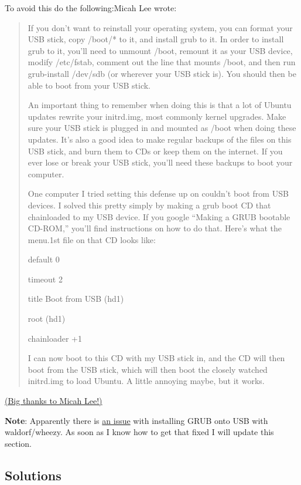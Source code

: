 \documentclass{article}
\begin{document}
 To avoid this do the following:{\sc Micah Lee wrote:}\begin{quotation}


 If you don’t want to reinstall your operating system, you can format your USB stick, copy /boot/* to it, and install grub to it. In order to install grub to it, you’ll need to unmount /boot, remount it as your USB device, modify /etc/fstab, comment out the line that mounts /boot, and then run grub-install /dev/sdb (or wherever your USB stick is). You should then be able to boot from your USB stick.


 An important thing to remember when doing this is that a lot of Ubuntu updates rewrite your initrd.img, most commonly kernel upgrades. Make sure your USB stick is plugged in and mounted as /boot when doing these updates. It’s also a good idea to make regular backups of the files on this USB stick, and burn them to CDs or keep them on the internet. If you ever lose or break your USB stick, you’ll need these backups to boot your computer.


 One computer I tried setting this defense up on couldn’t boot from USB devices. I solved this pretty simply by making a grub boot CD that chainloaded to my USB device. If you google “Making a GRUB bootable CD-ROM,” you’ll find instructions on how to do that. Here’s what the menu.1st file on that CD looks like:


 default 0

timeout 2

title Boot from USB (hd1)

root (hd1)

chainloader +1


 I can now boot to this CD with my USB stick in, and the CD will then boot from the USB stick, which will then boot the closely watched initrd.img to load Ubuntu. A little annoying maybe, but it works.\end{quotation}


 \href{https://twopointfouristan.wordpress.com/2011/04/17/pwning-past-whole-disk-encryption}{(Big thanks to Micah Lee!)}


 \textbf{Note}: Apparently there is \href{http://crunchbang.org/forums/viewtopic.php?pid=292208#p292208}{an issue} with installing GRUB onto USB with waldorf/wheezy. As soon as I know how to get that fixed I will update this section. 
\subsection{Solutions}
\end{document}
